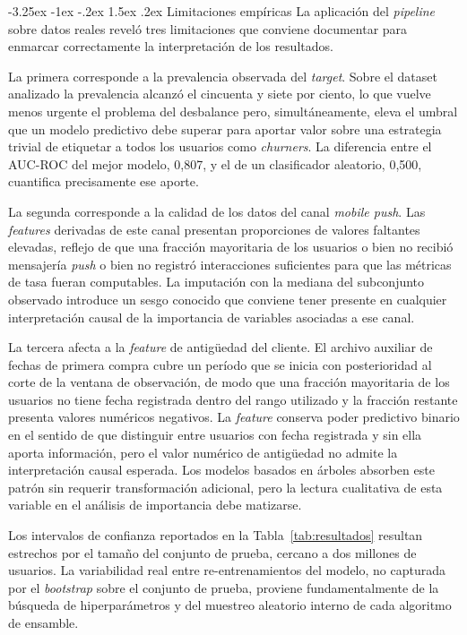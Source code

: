 \documentclass[11pt,a4paper]{article}
\makeatletter
\renewcommand\subsection{\@startsection{subsection}{2}{\z@}%
  {-3.25ex \@plus -1ex \@minus -.2ex}%
  {1.5ex \@plus .2ex}%
  {\normalfont\normalsize\itshape}}
\makeatother
\begin{document}
\subsection{Limitaciones empíricas}
La aplicación del \textit{pipeline} sobre datos reales reveló tres
limitaciones que conviene documentar para enmarcar correctamente la
interpretación de los resultados.

La primera corresponde a la prevalencia observada del \textit{target}.
Sobre el dataset analizado la prevalencia alcanzó el cincuenta y siete
por ciento, lo que vuelve menos urgente el problema del desbalance
pero, simultáneamente, eleva el umbral que un modelo predictivo debe
superar para aportar valor sobre una estrategia trivial de etiquetar a
todos los usuarios como \textit{churners}. La diferencia entre el
AUC-ROC del mejor modelo, 0,807, y el de un clasificador aleatorio,
0,500, cuantifica precisamente ese aporte.

La segunda corresponde a la calidad de los datos del canal
\textit{mobile push}. Las \textit{features} derivadas de este canal
presentan proporciones de valores faltantes elevadas, reflejo de que
una fracción mayoritaria de los usuarios o bien no recibió mensajería
\textit{push} o bien no registró interacciones suficientes para que
las métricas de tasa fueran computables. La imputación con la mediana
del subconjunto observado introduce un sesgo conocido que conviene
tener presente en cualquier interpretación causal de la importancia
de variables asociadas a ese canal.

La tercera afecta a la \textit{feature} de antigüedad del cliente. El
archivo auxiliar de fechas de primera compra cubre un período que se
inicia con posterioridad al corte de la ventana de observación, de
modo que una fracción mayoritaria de los usuarios no tiene fecha
registrada dentro del rango utilizado y la fracción restante presenta
valores numéricos negativos. La \textit{feature} conserva poder
predictivo binario en el sentido de que distinguir entre usuarios
con fecha registrada y sin ella aporta información, pero el valor
numérico de antigüedad no admite la interpretación causal esperada.
Los modelos basados en árboles absorben este patrón sin requerir
transformación adicional, pero la lectura cualitativa de esta variable
en el análisis de importancia debe matizarse.

Los intervalos de confianza reportados en la Tabla~\ref{tab:resultados}
resultan estrechos por el tamaño del conjunto de prueba, cercano a dos
millones de usuarios. La variabilidad real entre re-entrenamientos del
modelo, no capturada por el \textit{bootstrap} sobre el conjunto de
prueba, proviene fundamentalmente de la búsqueda de hiperparámetros y
del muestreo aleatorio interno de cada algoritmo de ensamble.%
\end{document}
